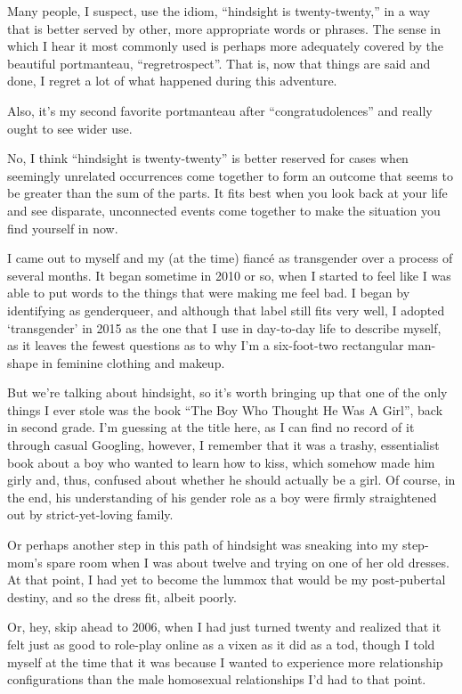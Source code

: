 Many people, I suspect, use the idiom, ``hindsight is twenty-twenty,'' in a way that is better served by other, more appropriate words or phrases.   The sense in which I hear it most commonly used is perhaps more adequately covered by the beautiful portmanteau, ``regretrospect''.  That is, now that things are said and done, I regret a lot of what happened during this adventure.

Also, it's my second favorite portmanteau after ``congratudolences'' and really ought to see wider use.

No, I think ``hindsight is twenty-twenty'' is better reserved for cases when seemingly unrelated occurrences come together to form an outcome that seems to be greater than the sum of the parts.  It fits best when you look back at your life and see disparate, unconnected events come together to make the situation you find yourself in now.

I came out to myself and my (at the time) fianc\'e as transgender over a process of several months.  It began sometime in 2010 or so, when I started to feel like I was able to put words to the things that were making me feel bad.  I began by identifying as genderqueer, and although that label still fits very well, I adopted `transgender' in 2015 as the one that I use in day-to-day life to describe myself, as it leaves the fewest questions as to why I'm a six-foot-two rectangular man-shape in feminine clothing and makeup.

But we're talking about hindsight, so it's worth bringing up that one of the only things I ever stole was the book ``The Boy Who Thought He Was A Girl'', back in second grade.  I'm guessing at the title here, as I can find no record of it through casual Googling, however, I remember that it was a trashy, essentialist book about a boy who wanted to learn how to kiss, which somehow made him girly and, thus, confused about whether he should actually be a girl.  Of course, in the end, his understanding of his gender role as a boy were firmly straightened out by strict-yet-loving family.

Or perhaps another step in this path of hindsight was sneaking into my step-mom's spare room when I was about twelve and trying on one of her old dresses.  At that point, I had yet to become the lummox that would be my post-pubertal destiny, and so the dress fit, albeit poorly.

Or, hey, skip ahead to 2006, when I had just turned twenty and realized that it felt just as good to role-play online as a vixen as it did as a tod, though I told myself at the time that it was because I wanted to experience more relationship configurations than the male homosexual relationships I'd had to that point.

